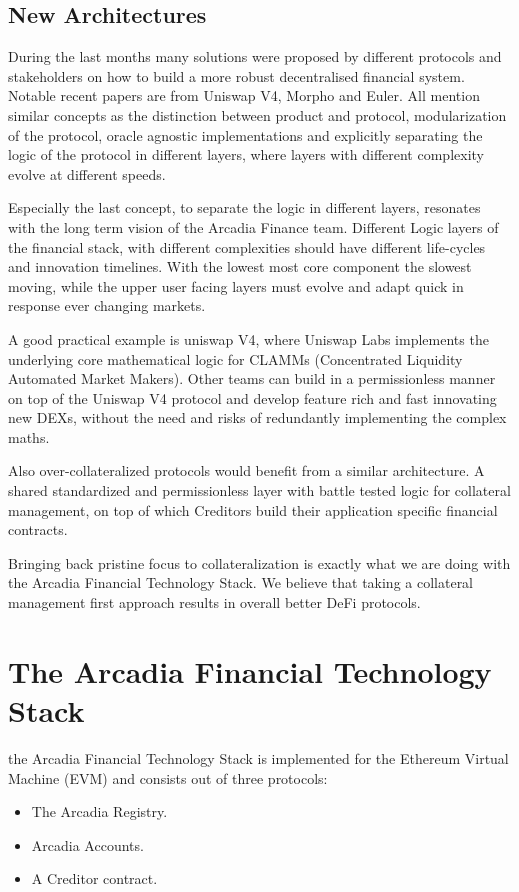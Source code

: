 \documentclass[sigconf,nonacm]{acmart}
\begin{document}
\subsection{New Architectures}
During the last months many solutions were proposed by different protocols and stakeholders on how to build a more robust decentralised financial system.
Notable recent papers are from Uniswap V4\cite{adams2023uniswap}, Morpho\cite{gontier2023morpho} and Euler\cite{euler2023protocols}.
All mention similar concepts as the distinction between product and protocol, modularization of the protocol, oracle agnostic implementations and explicitly separating the logic of the protocol in different layers,
where layers with different complexity evolve at different speeds.

Especially the last concept, to separate the logic in different layers, resonates with the long term vision of the Arcadia Finance team.
Different Logic layers of the financial stack, with different complexities should have different life-cycles and innovation timelines.
With the lowest most core component the slowest moving, while the upper user facing layers must evolve and adapt quick in response ever changing markets.

A good practical example is uniswap V4, where Uniswap Labs implements the underlying core mathematical logic for CLAMMs (Concentrated Liquidity Automated Market Makers).
Other teams can build in a permissionless manner on top of the Uniswap V4 protocol and develop feature rich and fast innovating new DEXs, without the need and risks of redundantly implementing the complex maths.

Also over-collateralized protocols would benefit from a similar architecture.
A shared standardized and permissionless layer with battle tested logic for collateral management, on top of which Creditors build their application specific financial contracts.

Bringing back pristine focus to collateralization is exactly what we are doing with the Arcadia Financial Technology Stack.
We believe that taking a collateral management first approach results in overall better DeFi protocols.


\section{The Arcadia Financial Technology Stack}

the Arcadia Financial Technology Stack is implemented for the Ethereum Virtual Machine (EVM) and consists out of three protocols:
\begin{itemize}
\item The Arcadia Registry.
\item Arcadia Accounts.
\item A Creditor contract.
\end{itemize}
\end{document}
